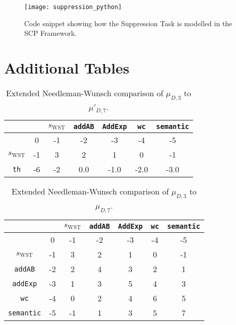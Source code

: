 \begin{figure}
\centering \texttt{[image: suppression\_python]}
\caption{Code snippet showing how the Suppression Task is modelled in the SCP Framework.}
\label{fig:sup_snippet}
\end{figure}

\FloatBarrier

\section*{Additional Tables}
\begin{table}[!htbp]
\begin{center}
\begin{tabular}{c | c c c c c c }
 & & $s_\text{WST}$ & \texttt{addAB} & \texttt{AddExp} & \texttt{wc} & \texttt{semantic}\\
\hline
 & 0 & -1 & -2 & -3 & -4 & -5\\
$s_\text{WST}$ & -1 & 3 & 2 & 1 & 0 & -1\\
\texttt{th} & -6 & -2 & 0.0 & -1.0 & -2.0 & -3.0
\end{tabular}
\caption{Extended Needleman-Wunsch comparison of $\mu_{D,3}$ to $\mu'_{D,7}$.}
\label{tbl:extal1}
\end{center}
\end{table}








\begin{table}[h!]
\begin{center}
\begin{tabular}{c | c c c c c c }
 & & $s_\text{WST}$ & \texttt{addAB} & \texttt{AddExp} & \texttt{wc} & \texttt{semantic}\\
\hline
 & 0 & -1 & -2 & -3 & -4 & -5\\
$s_\text{WST}$ & -1 & 3 & 2 & 1 & 0 & -1\\
\texttt{addAB} & -2 & 2 & 4 & 3 & 2 & 1\\
\texttt{addExp} & -3 & 1 & 3 & 5 & 4 & 3\\
\texttt{wc} & -4 & 0 & 2 & 4 & 6 & 5\\
\texttt{semantic} & -5 & -1 & 1 & 3 & 5 & 7
\end{tabular}
\caption{Extended Needleman-Wunsch comparison of $\mu_{D,3}$ to $\mu_{D,7}$.}
\label{tbl:extal2}
\end{center}
\end{table}
